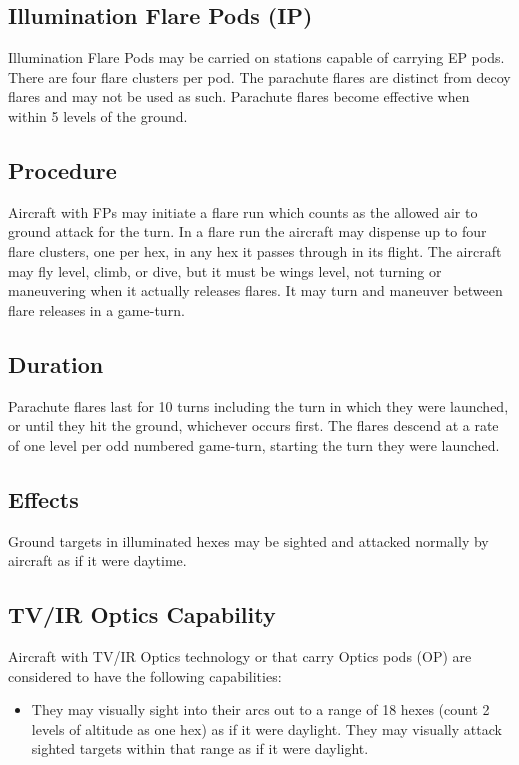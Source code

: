 \begin{advancedrules}
    \subsection{Illumination Flare Pods (IP)} Illumination Flare Pods may be carried on stations capable of carrying EP pods. There are four flare clusters per pod. The parachute flares are distinct from decoy flares and may not be used as such. Parachute flares become effective when within 5 levels of the ground.

    \subsection{Procedure} Aircraft with FPs may initiate a flare run which counts as the allowed air to ground attack for the turn. In a flare run the aircraft may dispense up to four flare clusters, one per hex, in any hex it passes through in its flight. The aircraft may fly level, climb, or dive, but it must be wings level, not turning or maneuvering when it actually releases flares. It may turn and maneuver between flare releases in a game-turn.

    \subsection{Duration} Parachute flares last for 10 turns including the turn in which they were launched, or until they hit the ground, whichever occurs first. The flares descend at a rate of one level per odd numbered game-turn, starting the turn they were launched.

    \subsection{Effects} Ground targets in illuminated hexes may be sighted and attacked normally by aircraft as if it were daytime.

    \subsection{TV/IR Optics Capability}

    Aircraft with TV/IR Optics technology or that carry Optics pods (OP) are considered to have the following capabilities:

    \begin{itemize}

        \item They may visually sight into their  arcs out to a range of 18 hexes (count 2 levels of altitude as one hex) as if it were daylight. They may visually attack sighted targets within that range as if it were daylight. 


\end{itemize}
\end{advancedrules}
